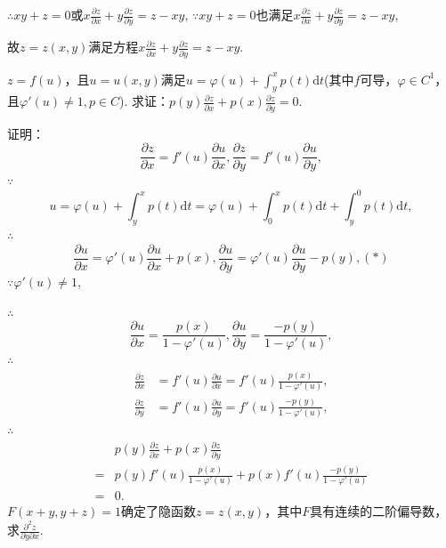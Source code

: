 \documentclass[12pt,UTF8]{ctexart}
\begin{document}
\begin{enumerate}
$\therefore xy+z=0$或$x\frac{\partial z}{\partial x}+y\frac{\partial z}{\partial y}=z-xy$,
$\because xy+z=0$也满足$x\frac{\partial z}{\partial x}+y\frac{\partial z}{\partial y}=z-xy$,

故$z=z(x,y)$满足方程$x\frac{\partial z}{\partial x}+y\frac{\partial z}{\partial y}=z-xy$.

$z=f(u)$，且$u=u(x,y)$满足$u=\varphi(u)+\int_y^xp(t)\mathrm dt$(其中$f$可导，$\varphi\in C^1$，且$\varphi'(u)\neq1,p\in C$). 求证：$p(y)\frac{\partial z}{\partial x}+p(x)\frac{\partial z}{\partial y}=0$.

证明：\[
\frac{\partial z}{\partial x}=f'(u)\frac{\partial u}{\partial x},\frac{\partial z}{\partial y}=f'(u)\frac{\partial u}{\partial y},
\]
$\because$
\[
u=\varphi(u)+\int_y^xp(t)\mathrm dt=\varphi(u)+\int_0^xp(t)\mathrm dt+\int_y^0p(t)\mathrm dt,
\]
$\therefore$
\[\frac{\partial u}{\partial x}=\varphi'(u)\frac{\partial u}{\partial x}+p(x),\frac{\partial u}{\partial y}=\varphi'(u)\frac{\partial u}{\partial y}-p(y),(*)\]
$\because\varphi'(u)\neq1$,

$\therefore$
\[
\frac{\partial u}{\partial x}=\frac{p(x)}{1-\varphi'(u)},\frac{\partial u}{\partial y}=\frac{-p(y)}{1-\varphi'(u)},
\]
$\therefore$
\[\begin{split}
\frac{\partial z}{\partial x}&=f'(u)\frac{\partial u}{\partial x}=f'(u)\frac{p(x)}{1-\varphi'(u)},\\
\frac{\partial z}{\partial y}&=f'(u)\frac{\partial u}{\partial y}=f'(u)\frac{-p(y)}{1-\varphi'(u)},
\end{split}\]
$\therefore$
\[\begin{split}
&p(y)\frac{\partial z}{\partial x}+p(x)\frac{\partial z}{\partial y}\\
=&p(y)f'(u)\frac{p(x)}{1-\varphi'(u)}+p(x)f'(u)\frac{-p(y)}{1-\varphi'(u)}\\
=&0.
\end{split}\]
$F(x+y,y+z)=1$确定了隐函数$z=z(x,y)$，其中$F$具有连续的二阶偏导数，求$\frac{\partial^2z}{\partial y\partial x}$.


\end{enumerate}
\end{document}
